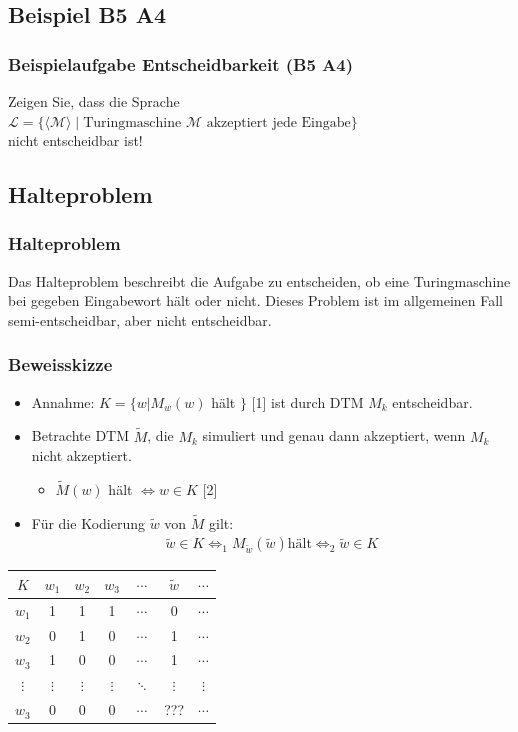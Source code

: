 \subsection{Beispiel B5 A4}
\begin{frame}
	\frametitle{Beispielaufgabe Entscheidbarkeit (B5 A4)}
	Zeigen Sie, dass die Sprache \\ $\mathcal{L} = \{ \langle \mathcal{M} \rangle \; | \; \mbox{Turingmaschine $\mathcal{M}$ akzeptiert jede Eingabe} \}$ \\ nicht entscheidbar ist!
\end{frame}
\subsection{Halteproblem}
\begin{frame}
	\frametitle{Halteproblem}
	Das Halteproblem beschreibt die Aufgabe zu entscheiden, ob eine Turingmaschine bei gegeben Eingabewort hält oder nicht. Dieses Problem ist im allgemeinen Fall semi-entscheidbar, aber nicht entscheidbar.
\end{frame}
\begin{frame}
	\frametitle{Beweisskizze}
	\begin{itemize}
		\item Annahme: $K = \{ w \vert M_w(w)$ hält $\}$ [1] ist durch DTM $M_k$ entscheidbar.
		\item Betrachte DTM $\tilde M$, die $M_k$ simuliert und genau dann akzeptiert, wenn $M_k$ nicht akzeptiert.
		\begin{itemize}
			\item $\tilde M(w)$ hält $\Leftrightarrow w \in K$ [2]
		\end{itemize}
		\item Für die Kodierung $\tilde w$ von $\tilde M$ gilt:
		\begin{align*}
			\tilde w \in K \Leftrightarrow_1 M_{\tilde w}(\tilde w) \text{hält} \Leftrightarrow_2 \tilde w \in K
		\end{align*}
	\end{itemize}
	\begin{tabular}{|c|c|c|c|c|c|c|}
	\hline
	$K$ & $w_1$ & $w_2$ & $w_3$ & $\cdots$ & $\tilde w$ & $\cdots$\\
	\hline
	$w_1$ & \color{red} 1 & 1 & 1 & $\cdots$ & 0 & $\cdots$\\
	\hline
	$w_2$ & 0 & \color{red} 1 & 0 & $\cdots$ & 1 & $\cdots$\\
	\hline
	$w_3$ & 1 & 0 & \color{red} 0 & $\cdots$ & 1 & $\cdots$\\
	\hline
	$\vdots$ & $\vdots$ & $\vdots$ & $\vdots$ & \color{red} $\ddots$ & $\vdots$ & $\vdots$\\
	\hline
	$w_3$ & 0 & 0 & 0 & $\cdots$ & \color{red} ??? & $\cdots$\\
	\hline
	\end{tabular}
\end{frame}

